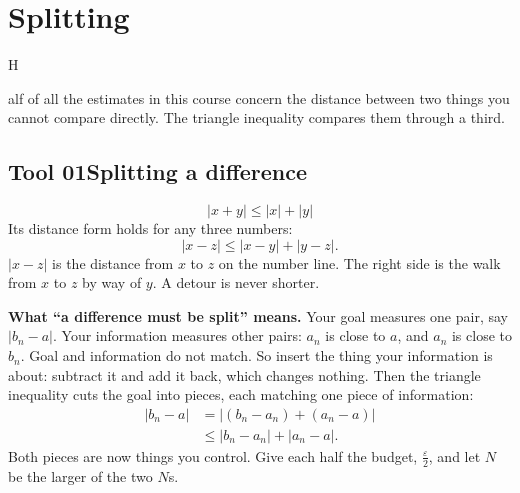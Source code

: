 \documentclass{kaelearn}
\let\needspace\Needspace
\newcommand\eps{\varepsilon}
\begin{document}
\section{Splitting}

\opening{H}{alf of all} the estimates in this course concern the distance between two things you cannot compare directly.
The triangle inequality compares them through a third.

\subsection{Tool 01\quad Splitting a difference}
\[ |x+y|\le|x|+|y| \]
Its distance form holds for any three numbers:
\[ |x-z|\le|x-y|+|y-z| . \]
$|x-z|$ is the distance from $x$ to $z$ on the number line. The right side is the walk from $x$ to $z$ by way of $y$. A detour
is never shorter.

\par\needspace{36mm}
\begin{center}
\end{center}

\textbf{What ``a difference must be split'' means.} Your goal measures one pair, say $|b_n-a|$. Your information measures
other pairs: $a_n$ is close to $a$, and $a_n$ is close to $b_n$. Goal and information do not match. So insert the thing your
information is about: subtract it and add it back, which changes nothing. Then the triangle inequality cuts the goal into pieces,
each matching one piece of information:
\[
\begin{aligned}
|b_n-a| &= |(b_n-a_n)+(a_n-a)|\\
&\le |b_n-a_n|+|a_n-a| .
\end{aligned}
\]
Both pieces are now things you control. Give each half the budget, $\frac\eps2$, and let $N$ be the larger of the two $N$s.
\end{document}

